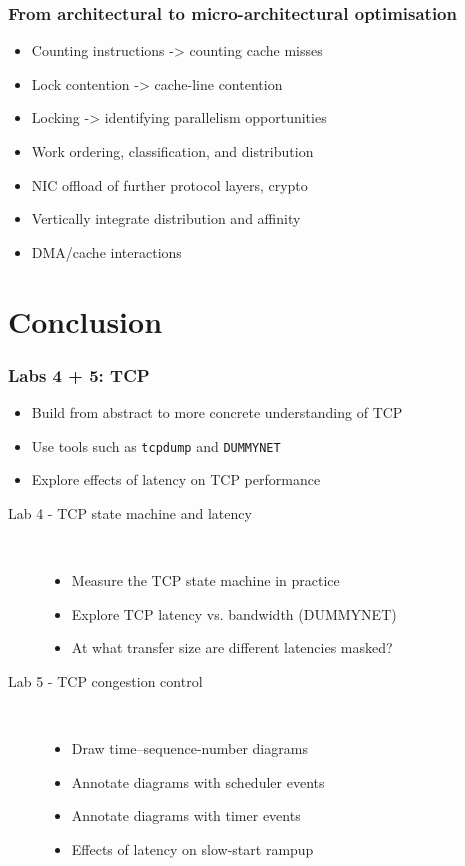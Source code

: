 \begin{frame}
  \frametitle{From architectural to micro-architectural optimisation}

  \begin{itemize}
    \item Counting instructions -> counting cache misses
    \item Lock contention -> cache-line contention
    \item Locking -> identifying parallelism opportunities
    \item Work ordering, classification, and distribution
    \item NIC offload of further protocol layers, crypto
    \item Vertically integrate distribution and affinity
    \item DMA/cache interactions
  \end{itemize}
\end{frame}

\section{Conclusion}

\begin{frame}
  \frametitle{Labs 4 + 5: TCP}

  \begin{itemize}
    \item Build from abstract to more concrete understanding of TCP
    \item Use tools such as \texttt{tcpdump} and \texttt{DUMMYNET}
    \item Explore effects of latency on TCP performance
  \end{itemize}

  \begin{description}
    \item[Lab 4 - TCP state machine and latency] ~ \\
      \begin{itemize}
	\item Measure the TCP state machine in practice
	\item Explore TCP latency vs. bandwidth (DUMMYNET)
	\item At what transfer size are different latencies masked?
      \end{itemize}

    \item[Lab 5 - TCP congestion control] ~ \\
      \begin{itemize}
        \item Draw time--sequence-number diagrams
	\item Annotate diagrams with scheduler events
	\item Annotate diagrams with timer events
	\item Effects of latency on slow-start rampup
      \end{itemize}
  \end{description}
\end{frame}


